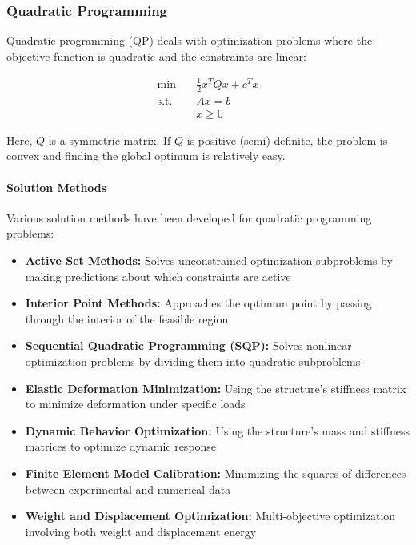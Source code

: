 \subsubsection{Quadratic Programming}

Quadratic programming (QP) deals with optimization problems where the objective function is quadratic and the constraints are linear:

\begin{equation}
\begin{aligned}
\min & \quad \frac{1}{2}x^TQx + c^Tx \\
\text{s.t.} & \quad Ax = b \\
& \quad x \geq 0
\end{aligned}
\end{equation}

Here, $Q$ is a symmetric matrix. If $Q$ is positive (semi) definite, the problem is convex and finding the global optimum is relatively easy.

\paragraph{Solution Methods}
Various solution methods have been developed for quadratic programming problems:
\begin{itemize}
    \item \textbf{Active Set Methods:} Solves unconstrained optimization subproblems by making predictions about which constraints are active
    
    \item \textbf{Interior Point Methods:} Approaches the optimum point by passing through the interior of the feasible region
    
    \item \textbf{Sequential Quadratic Programming (SQP):} Solves nonlinear optimization problems by dividing them into quadratic subproblems
\end{itemize}

\begin{tcolorbox}[title=QP Applications in Structural Engineering]
\begin{itemize}
    \item \textbf{Elastic Deformation Minimization:} Using the structure's stiffness matrix to minimize deformation under specific loads
    
    \item \textbf{Dynamic Behavior Optimization:} Using the structure's mass and stiffness matrices to optimize dynamic response
    
    \item \textbf{Finite Element Model Calibration:} Minimizing the squares of differences between experimental and numerical data
    
    \item \textbf{Weight and Displacement Optimization:} Multi-objective optimization involving both weight and displacement energy
\end{itemize}
\end{tcolorbox}

